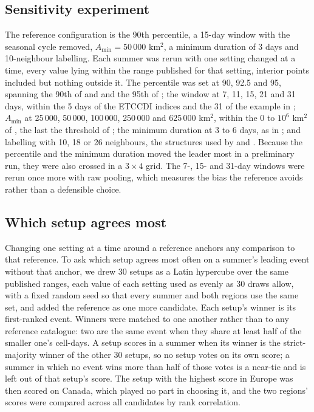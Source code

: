 \documentclass{amsdraft}
\begin{document}
\subsection{Sensitivity experiment}
\label{sec:sensitivity}

The reference configuration is the 90th percentile, a 15-day window with the
seasonal cycle removed, $A_{\min} = 50\,000$ km$^2$, a minimum duration of 3
days and 10-neighbour labelling. Each summer was rerun with one setting
changed at a time, every value lying within the range published for that
setting, interior points included but nothing outside it. The percentile was
set at 90, 92.5 and 95, spanning the 90th of \citet{PerkinsAlexander2013} and
\citet{Zhang2025} and the 95th of \citet{Mandonnet2026}; the window at 7, 11,
15, 21 and 31 days, within the 5 days of the ETCCDI indices \citep{Zhang2011}
and the 31 of the example in \citet{BrunnerVoigt2024}; $A_{\min}$ at
25\,000, 50\,000, 100\,000, 250\,000 and 625\,000 km$^2$, within the 0 to
$10^6$ km$^2$ of \citet{Zhang2025}, the last the threshold of
\citet{LhotkaKysely2022}; the minimum duration at 3 to 6 days, as in
\citet{Mandonnet2026}; and labelling with 10, 18 or 26 neighbours, the
structures used by \citet{Zhang2025} and \citet{Mandonnet2026}. Because the
percentile and the minimum duration moved the leader most in a preliminary
run, they were also crossed in a $3 \times 4$ grid. The 7-, 15- and 31-day
windows were rerun once more with
raw pooling, which
measures the bias the reference avoids rather than a defensible choice.

\subsection{Which setup agrees most}
\label{sec:consensus}

Changing one setting at a time around a reference anchors any comparison to
that reference. To ask which setup agrees most often on a summer's leading
event without that anchor, we drew 30 setups as a Latin hypercube over the
same published ranges, each value of each setting used as evenly as 30 draws
allow, with a fixed random seed so that every summer and both regions use
the same set, and added the reference as one more candidate. Each setup's
winner is its first-ranked event. Winners were matched to one another rather
than to any reference catalogue: two are the same event when they share at
least half of the smaller one's cell-days. A setup scores in a summer when
its winner is the strict-majority winner of the other 30 setups, so no setup
votes on its own score; a summer in which no event wins more than half of
those votes is a near-tie and is left out of that setup's score. The setup
with the highest score in Europe was then scored on Canada, which played no
part in choosing it, and the two regions' scores were compared across all
candidates by rank correlation.
\end{document}
